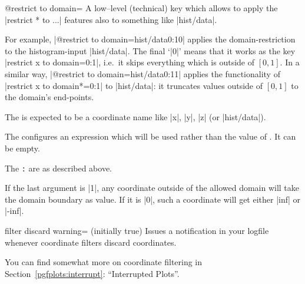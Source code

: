 \begin{pgfplotskey}{@restrict to domain=}
	A low--level (technical) key which allows to apply the |restrict * to ...| features also to something like |hist/data|.

	For example,
	|@restrict to domain={hist/data}{}{0:1}{0}| applies the domain-restriction to the histogram-input |hist/data|. The final `|0|' means that it works as the key |restrict x to domain=0:1|, i.e.\ it skips everything which is outside of $[0,1]$.  In a similar way, 
	|@restrict to domain={hist/data}{}{0:1}{1}| applies the functionality of |restrict x to domain*=0:1| to |hist/data|: it truncates values outside of $[0,1]$ to the domain's end-points.

	The  is expected to be a coordinate name like |x|, |y|, |z| (or |hist/data|).

	The  configures an expression which will be used rather than the value of . It can be empty.

	The \texttt{:} are as described above.

	If the last argument is |1|, any coordinate outside of the allowed domain will take the domain boundary as value. If it is |0|, such a coordinate will get either |inf| or |-inf|.
\end{pgfplotskey}

\begin{pgfplotskey}{filter discard warning= (initially true)}
	Issues a notification in your logfile whenever coordinate filters discard coordinates.
\end{pgfplotskey}

You can find somewhat more on coordinate filtering in Section~\ref{pgfplots:interrupt}: ``Interrupted Plots''.
